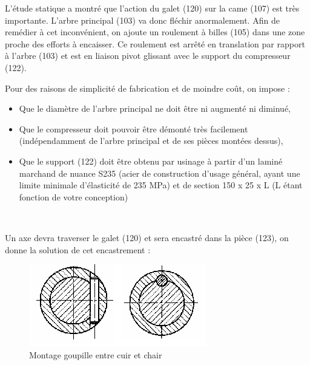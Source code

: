 
L'étude statique a montré que l'action du galet (120) sur la came (107) est très importante. L'arbre principal (103) va donc fléchir anormalement. Afin de remédier à cet inconvénient, on ajoute un roulement à billes (105) dans une zone proche des efforts à encaisser. Ce roulement est arrêté en translation par rapport à l'arbre (103) et est en liaison pivot glissant avec le support du compresseur (122).

Pour des raisons de simplicité de fabrication et de moindre coût, on impose :
\begin{itemize}
 \item Que le diamètre de l'arbre principal ne doit être ni augmenté ni diminué,
 \item Que le compresseur doit pouvoir être démonté très facilement (indépendamment de l'arbre principal et de ses pièces montées dessus),
 \item Que le support (122) doit être obtenu par usinage à partir d'un laminé marchand de nuance S235 (acier de construction d'usage général, ayant une limite minimale d'élasticité de 235 MPa) et de section 150 x 25 x L (L étant fonction de votre conception)
\end{itemize}


~\

Un axe devra traverser le galet (120) et sera encastré dans la pièce (123), on donne la solution de cet encastrement :

\begin{figure}[!h]
\begin{center}
	\includegraphics[width=0.6\linewidth]{img/fig08}
\end{center}
\caption{Montage goupille \og entre cuir et chair \fg}
\label{fig08}
\end{figure} 

